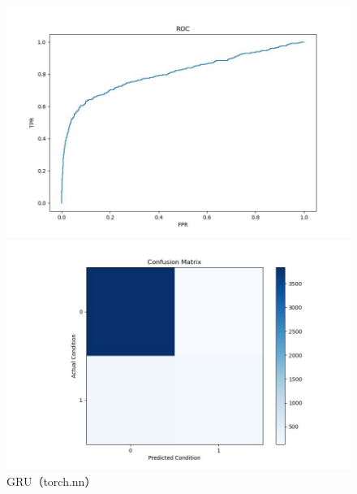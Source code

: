 \documentclass[UTF8]{article}
\begin{document}
\begin{figure}[h]
    \begin{minipage}{.48\linewidth}
        \centering
        \includegraphics[width=\linewidth]{../figure/GRU_ROC.jpg}
    \end{minipage}
    \begin{minipage}{.48\linewidth}
        \centering
        \includegraphics[width=\linewidth]{../figure/GRU_Confusion.jpg}
    \end{minipage}
    \caption{GRU（torch.nn）}
    \label{fig:GRU}
\end{figure}
\end{document}
